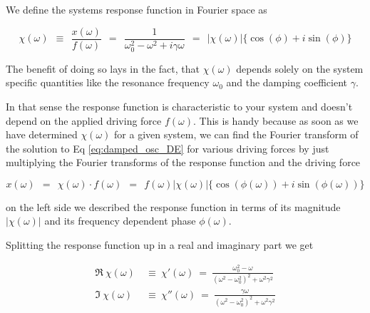 \documentclass[10pt]{report}
\numberwithin{equation}{chapter}
\newcommand{\refEq}[1]{
  Eq  \ref{#1}
}
\begin{document}
We define the systems response function in Fourier space as

\begin{equation} \label{eq:damped_osc_respond}
  \chi(\omega) ~~\equiv~~ \frac{x(\omega)}{f(\omega)} ~~=~~ \frac{1}{\omega_0^2 - \omega^2 + i\gamma\omega} ~~=~~ | \chi(\omega)| \{\cos(\phi) + i\sin(\phi) \}
\end{equation}

The benefit of doing so lays in the fact, that $\chi(\omega)$ depends solely on the system specific 	quantities like the resonance frequency $\omega_0$ and the damping coefficient $\gamma$.

In that sense the response function is characteristic to your system and doesn't depend on the applied driving force $f(\omega)$. This is handy because as soon as we have determined $\chi(\omega)$ for a given system, we can find the Fourier transform of the solution to \refEq{eq:damped_osc_DE} for various driving forces by just multiplying the Fourier transforms of the response function and the driving force 

\begin{equation}
  x(\omega) ~~=~~ \chi(\omega) \cdot f(\omega) 
  ~~=~~ f(\omega) |\chi(\omega)| \{\cos(\phi(\omega)) +i \sin(\phi(\omega))\}
\end{equation}

on the left side we described the response function in terms of its magnitude $|\chi(\omega)|$ and its frequency dependent phase $\phi(\omega)$.



Splitting the response function up in a real and imaginary part we get

\begin{align}
  \Re\ \chi(\omega) ~& \equiv~ \chi'(\omega) ~=~ \frac{\omega^2_0 - \omega}{(\omega^2-\omega^2_0)^2 + \omega^2 \gamma^2} \\
  \Im\ \chi(\omega) ~& \equiv~ \chi''(\omega) ~=~ \frac{\gamma \omega}{(\omega^2 - \omega^2_0)^2 + \omega^2 \gamma^2}
\end{align}

\end{document}
